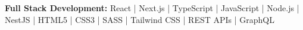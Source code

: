 \textbf{Full Stack Development:} React | Next.js | TypeScript | JavaScript | Node.js | NestJS | HTML5 | CSS3 | SASS | Tailwind CSS | REST APIs | GraphQL